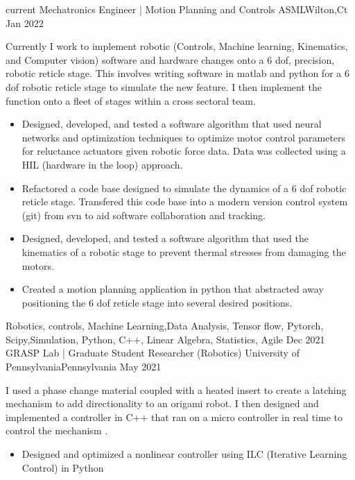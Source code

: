\begin{experiences}

\experience
  {current}      {Mechatronics Engineer |  Motion Planning and Controls }{ASML}{Wilton,Ct}
  {Jan 2022} {Currently I work to implement robotic (Controls, Machine learning, Kinematics, and Computer vision) software and hardware changes onto a 6 dof, precision, robotic reticle stage. This involves writing software in matlab and python for a 6 dof robotic reticle stage to simulate the new feature. I then implement the function onto a fleet of stages within a cross sectoral team. 
			\begin{itemize}
			\item Designed, developed, and tested  a software algorithm  that used neural networks and optimization techniques to optimize motor control 					parameters for reluctance actuators given robotic force data. Data was collected using a HIL (hardware in the loop) approach. 
			\item Refactored a code base designed to simulate the dynamics of a 6 dof robotic reticle stage. Transfered this code base into a modern version 					control system (git) from svn to aid software collaboration and tracking.
			\item Designed, developed, and tested a software algorithm that used the kinematics of a robotic stage to prevent thermal stresses 						from damaging the motors. 
           		\item Created a motion planning application in python that abstracted away positioning the 6 dof reticle stage into several desired positions.
		 	\end{itemize} 
                 }
                {Robotics, controls, Machine Learning,Data Analysis, Tensor flow, Pytorch, Scipy,Simulation, Python, C++, Linear Algebra, Statistics, Agile}   
 \experience
    {Dec 2021}     {GRASP Lab | Graduate Student Researcher (Robotics)  }{ University of Pennsylvania}{Pennsylvania}
    {May 2021}    {I used a phase change material coupled with a heated insert to create a latching mechanism to add directionality to an origami robot. I then designed and implemented a controller in C++ that ran on a micro controller in real time to control the mechanism .
                      \begin{itemize}
			\item Designed and optimized a nonlinear controller using ILC (Iterative Learning Control) in Python 

\end{itemize}}
\end{experiences}
